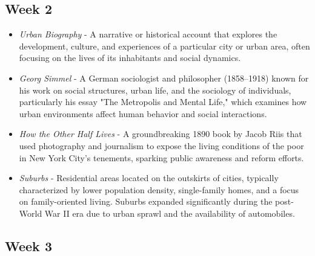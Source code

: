 \documentclass[12pt]{article}
\begin{document}
\subsection*{Week 2}

\begin{itemize}
    \item \textit{Urban Biography} - A narrative or historical account that explores the development, culture, and experiences of a particular city or urban area, often focusing on the lives of its inhabitants and social dynamics.
    
    \item \textit{Georg Simmel} - A German sociologist and philosopher (1858–1918) known for his work on social structures, urban life, and the sociology of individuals, particularly his essay "The Metropolis and Mental Life," which examines how urban environments affect human behavior and social interactions.
    
    \item \textit{How the Other Half Lives} - A groundbreaking 1890 book by Jacob Riis that used photography and journalism to expose the living conditions of the poor in New York City's tenements, sparking public awareness and reform efforts.
    
    \item \textit{Suburbs} - Residential areas located on the outskirts of cities, typically characterized by lower population density, single-family homes, and a focus on family-oriented living. Suburbs expanded significantly during the post-World War II era due to urban sprawl and the availability of automobiles.
\end{itemize}

\subsection*{Week 3}
\end{document}
